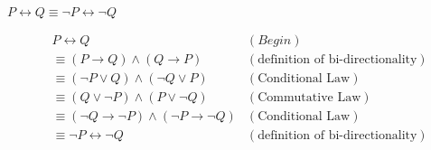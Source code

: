 
$P \leftrightarrow Q \equiv \neg P \leftrightarrow \neg Q$

\begin{align*}
  &P \leftrightarrow Q &(Begin)\\
  &\equiv (P \rightarrow Q) \land (Q \rightarrow P) &(\textrm{definition of
    bi-directionality})\\
  &\equiv (\neg P \lor Q) \land (\neg Q \lor P) &(\textrm{Conditional Law})\\
  &\equiv (Q \lor \neg P) \land (P \lor \neg Q) &(\textrm{Commutative Law})\\
  &\equiv (\neg Q \rightarrow \neg P) \land (\neg P \rightarrow \neg Q)
    &(\textrm{Conditional Law})\\
  &\equiv \neg P \leftrightarrow \neg Q &(\textrm{definition of bi-directionality})\\
\end{align*}
